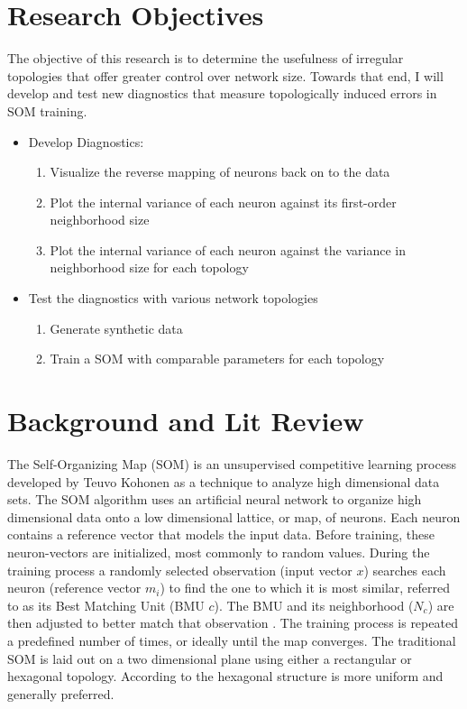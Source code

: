 \documentclass[11pt]{article}
\begin{document}
\section{Research Objectives}
The objective of this research is to determine the usefulness of irregular topologies that offer greater control over network size. Towards that end, I will develop and test new diagnostics that measure topologically induced errors in SOM training.

\begin{itemize}
	\item Develop Diagnostics:
	\begin{enumerate}
		\item Visualize the reverse mapping of neurons back on to the data
    		\item Plot the internal variance of each neuron against its first-order neighborhood size
		\item Plot the internal variance of each neuron against the variance in
neighborhood size for each topology
	\end{enumerate}
	\item Test the diagnostics with various network topologies
	\begin{enumerate}
    		\item Generate synthetic data
    		\item Train a SOM with comparable parameters for each topology
	\end{enumerate}
\end{itemize}

\section{Background and Lit Review}
The Self-Organizing Map (SOM) is an unsupervised competitive learning process
developed by Teuvo Kohonen as a technique to analyze high dimensional data sets.
The SOM algorithm uses an artificial neural network to organize high dimensional
data onto a low dimensional lattice, or map, of neurons.  Each neuron contains a
reference vector that models the input data.  Before training, these
neuron-vectors are initialized, most commonly to random values.  During the
training process a randomly selected observation (input vector $x$) searches
each neuron (reference vector $m_i$) to find the one to which it is most
similar, referred to as its Best Matching Unit (BMU $c$).  The BMU and its
neighborhood ($N_c$) are then adjusted to better match that observation
\citep{Kohonen2000}.  The training process is repeated a predefined number of
times, or ideally until the map converges.  The traditional SOM is laid out on a
two dimensional plane using either a rectangular or hexagonal topology.
According to \cite{wu2006} the hexagonal structure is more uniform and generally
preferred.
\end{document}
